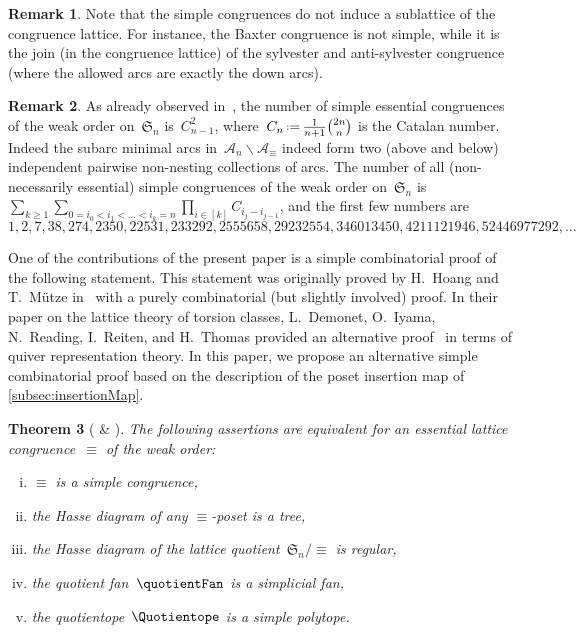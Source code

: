 \documentclass{amsart}
\newtheorem{theorem}{Theorem}[section]
\theoremstyle{definition}
\newtheorem{remark}[theorem]{Remark}
\newcommand{\f}[1]{{\mathfrak{#1}}} %
\newcommand{\ssm}{\smallsetminus} %
\newcommand{\eqdef}{\mbox{\,\raisebox{0.2ex}{\scriptsize\ensuremath{\mathrm:}}\ensuremath{=}\,}} %
\newcommand{\arcs}{{\mathcal{A}}} %
\begin{document}
\begin{remark}
Note that the simple congruences do not induce a sublattice of the congruence lattice.
For instance, the Baxter congruence is not simple, while it is the join (in the congruence lattice) of the sylvester and anti-sylvester congruence (where the allowed arcs are exactly the down arcs).
\end{remark}

\begin{remark}
As already observed in~\cite[Sect.~4.4]{HoangMutze}, the number of simple essential congruences of the weak order on~$\f{S}_n$ is~$C_{n-1}^2$, where~$C_n \eqdef \frac{1}{n+1} \binom{2n}{n}$ is the Catalan number.
Indeed the subarc minimal arcs in~$\arcs_n \ssm \arcs_\equiv$ indeed form two (above and below) independent pairwise non-nesting collections of arcs.
The number of all (non-necessarily essential) simple congruences of the weak order on~$\f{S}_n$ is~$\sum_{k \ge 1} \sum_{0 = i_0 < i_1 < \dots < i_k = n} \prod_{i \in [k]} C_{i_j - i_{j-1}}$, and the first few numbers are
\[
1, 2, 7, 38, 274, 2350, 22531, 233292, 2555658, 29232554, 346013450, 4211121946, 52446977292, \dots
\]
\end{remark}

One of the contributions of the present paper is a simple combinatorial proof of the following statement.
This statement was originally proved by H.~Hoang and T.~Mütze in~\cite[Sect.~4.4]{HoangMutze} with a purely combinatorial (but slightly involved) proof.
In their paper on the lattice theory of torsion classes, L.~Demonet, O.~Iyama, N.~Reading, I.~Reiten, and H.~Thomas provided an alternative proof~\cite[Sect.~6.3]{DemonetIyamaReadingReitenThomas} in terms of quiver representation theory.
In this paper, we propose an alternative simple combinatorial proof based on the description of the poset insertion map of \cref{subsec:insertionMap}.

\begin{theorem}[{\cite[Sect.~4.4]{HoangMutze} \& \cite[Sect.~6.3]{DemonetIyamaReadingReitenThomas}}]
\label{thm:simpleCongruences}
The following assertions are equivalent for an essential lattice congruence~$\equiv$ of the weak order:
\begin{enumerate}[(i)]
\item $\equiv$ is a simple congruence,
\item the Hasse diagram of any $\equiv$-poset is a tree,
\item the Hasse diagram of the lattice quotient~$\f{S}_n/{\equiv}$ is regular,
\item the quotient fan~$\quotientFan$ is a simplicial fan,
\item the quotientope~$\Quotientope$ is a simple polytope.
\end{enumerate}
\end{theorem}
\end{document}
